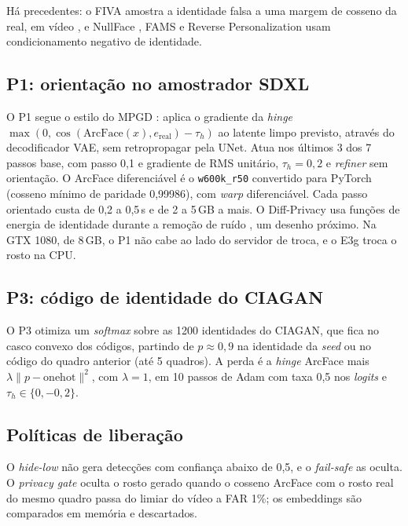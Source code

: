 Há precedentes: o FIVA amostra a identidade falsa a uma margem de cosseno da real, em vídeo \citep{fiva}, e NullFace \citep{nullface}, FAMS \citep{kung} e Reverse Personalization \citep{revpers} usam condicionamento negativo de identidade.

\subsection{P1: orientação no amostrador SDXL}

O P1 segue o estilo do MPGD \citep{mpgd}: aplica o gradiente da \emph{hinge} $\max(0, \cos(\mathrm{ArcFace}(x), e_{\mathrm{real}}) - \tau_h)$ ao latente limpo previsto, através do decodificador VAE, sem retropropagar pela UNet. Atua nos últimos 3 dos 7 passos base, com passo 0,1 e gradiente de RMS unitário, $\tau_h = 0{,}2$ e \emph{refiner} sem orientação. O ArcFace diferenciável é o \texttt{w600k\_r50} convertido para PyTorch (cosseno mínimo de paridade 0,99986), com \emph{warp} diferenciável. Cada passo orientado custa de 0,2 a 0,5\,s e de 2 a 5\,GB a mais. O Diff-Privacy usa funções de energia de identidade durante a remoção de ruído \citep{diffprivacy}, um desenho próximo. Na GTX 1080, de 8\,GB, o P1 não cabe ao lado do servidor de troca, e o E3g troca o rosto na CPU.

\subsection{P3: código de identidade do CIAGAN}

O P3 otimiza um \emph{softmax} sobre as 1200 identidades do CIAGAN, que fica no casco convexo dos códigos, partindo de $p \approx 0{,}9$ na identidade da \emph{seed} ou no código do quadro anterior (até 5 quadros). A perda é a \emph{hinge} ArcFace mais $\lambda \lVert p - \mathrm{onehot}\rVert^2$, com $\lambda = 1$, em 10 passos de Adam com taxa 0,5 nos \emph{logits} e $\tau_h \in \{0, -0{,}2\}$.

\subsection{Políticas de liberação}

O \emph{hide-low} não gera detecções com confiança abaixo de 0,5, e o \emph{fail-safe} as oculta. O \emph{privacy gate} oculta o rosto gerado quando o cosseno ArcFace com o rosto real do mesmo quadro passa do limiar do vídeo a FAR 1\%; os embeddings são comparados em memória e descartados.

